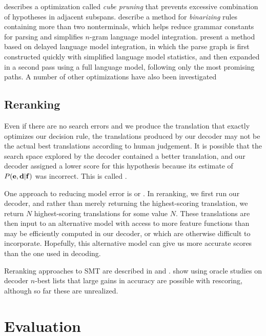 \citet{Chiang:2007:cl} describes a optimization
called {\em cube pruning} that prevents excessive combination
of hypotheses in adjacent subspans.  \citet{Zhang:2006:hlt-naacl}
describe a method for {\em binarizing} rules containing more
than two nonterminals, which helps reduce grammar constants for
parsing and simplifies $n$-gram language model integration.
\citet{Venugopal:2007:hlt-naacl} present a
method based on delayed language model integration, in which
the parse graph is first constructed quickly with simplified language
model statistics, and then expanded in a second pass using a full
language model, following only the most promising paths.  A number of
other optimizations have also been investigated
\citep{Huang:2005:iwpt:k-best,Huang:2007:acl}

\subsection{Reranking}\label{sec:reranking}

Even if there are no search errors and we produce the 
translation that exactly optimizes our decision rule, 
the translations produced by our decoder may not be 
the actual best translations according to human judgement.
It is possible that the search space explored by the decoder 
contained a better translation, and our decoder 
assigned a lower score for this hypothesis because its
estimate of $P({\bf e},{\bf d}|{\bf f})$ was incorrect.
This is called .

One approach to reducing model error 
is  or .  In reranking, 
we first run our decoder, and rather than merely returning the 
highest-scoring translation, we return $N$ highest-scoring 
translations for some value $N$.
These translations are then input to an alternative model with 
access to more feature functions than may be efficiently computed in 
our decoder, or which are otherwise difficult to incorporate.
Hopefully, this alternative model can give us more
accurate scores than the one used in decoding.

Reranking approaches to SMT are described in 
\citet{Och:2004:naacl} and \citet{Shen:2004:naacl}.
\citet{Och:2004:naacl} show using oracle studies on
decoder $n$-best lists that large gains in accuracy are possible
with rescoring, although so far these are unrealized.

\section{Evaluation}\label{sec:evaluation}

